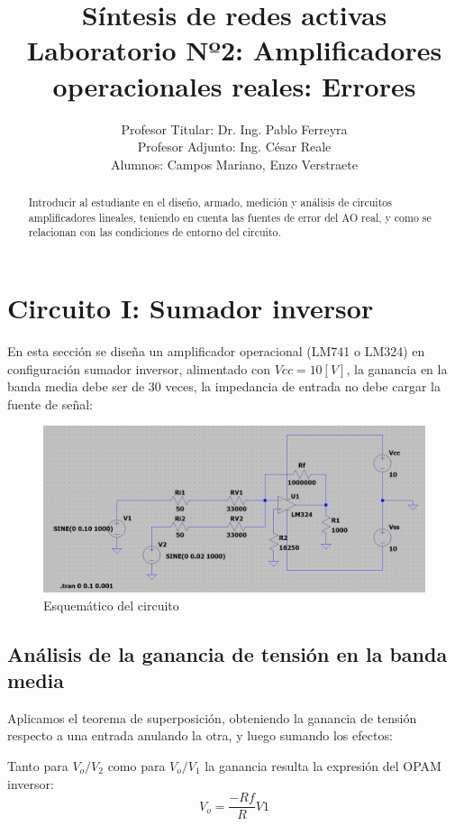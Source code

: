\documentclass[12pt]{article}
\title{Síntesis de redes activas \\ Laboratorio Nº2: Amplificadores operacionales reales: Errores}
\author{Profesor Titular: Dr. Ing. Pablo Ferreyra \\  Profesor Adjunto: Ing. César Reale \\ Alumnos: Campos Mariano, 
	Enzo Verstraete}
\begin{document}
	\maketitle
	
	\begin{abstract}
		Introducir al estudiante en el diseño, armado, medición y análisis de circuitos amplificadores
		lineales, teniendo en cuenta las fuentes de error del AO real, y como se relacionan con las
		condiciones de entorno del circuito.
	\end{abstract}\newpage
	
	\section{Circuito I: Sumador inversor}
		En esta sección se diseña un amplificador operacional (LM741 o LM324) en configuración sumador inversor, alimentado con $Vcc=10[V]$, la ganancia en la banda media debe ser de 30 veces, la impedancia de entrada no debe cargar la fuente de señal:
		
	\begin{figure}[h]
		\includegraphics[width=\linewidth]{Imagenes_simulaciones/Esquematico_Circ1}
		\caption[Esquemático del circuito]{Esquemático del circuito}
		\label{fig:esquematicocirc1}
	\end{figure}
	
	\subsection{Análisis de la ganancia de tensión en la banda media}
	Aplicamos el teorema de superposición, obteniendo la ganancia de tensión respecto a una entrada anulando la otra, y luego sumando los efectos:
	
	Tanto para $V_{o}/V_{2}$ como para $V_{o}/V_{1}$ la ganancia resulta la expresión del OPAM inversor:
	\begin{equation}
		V_{o}= \frac{-Rf}{R}V1
	\end{equation}
\end{document}
